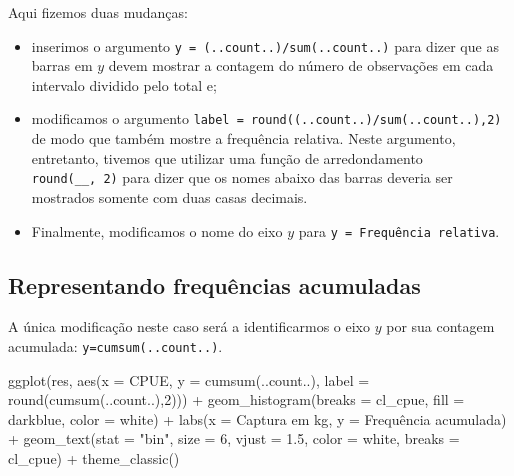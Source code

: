 \documentclass[
]{book}
\newenvironment{Shaded}{\begin{snugshade}}{\end{snugshade}}
\newcommand{\AttributeTok}[1]{\textcolor[rgb]{0.77,0.63,0.00}{#1}}
\newcommand{\DecValTok}[1]{\textcolor[rgb]{0.00,0.00,0.81}{#1}}
\newcommand{\FloatTok}[1]{\textcolor[rgb]{0.00,0.00,0.81}{#1}}
\newcommand{\FunctionTok}[1]{\textcolor[rgb]{0.00,0.00,0.00}{#1}}
\newcommand{\NormalTok}[1]{#1}
\newcommand{\SpecialCharTok}[1]{\textcolor[rgb]{0.00,0.00,0.00}{#1}}
\newcommand{\StringTok}[1]{\textcolor[rgb]{0.31,0.60,0.02}{#1}}
\begin{document}
Aqui fizemos duas mudanças:

\begin{itemize}
\item
  inserimos o argumento \texttt{y\ =\ (..count..)/sum(..count..)} para dizer que as barras em \(y\) devem mostrar a contagem do número de observações em cada intervalo dividido pelo total e;
\item
  modificamos o argumento \texttt{label\ =\ round((..count..)/sum(..count..),2)} de modo que também mostre a frequência relativa. Neste argumento, entretanto, tivemos que utilizar uma função de arredondamento \texttt{round(\_\_,\ 2)} para dizer que os nomes abaixo das barras deveria ser mostrados somente com duas casas decimais.
\item
  Finalmente, modificamos o nome do eixo \(y\) para \texttt{y\ =\ \textquotesingle{}Frequência\ relativa\textquotesingle{}}.
\end{itemize}

\hypertarget{representando-frequuxeancias-acumuladas}{%
\subsection{Representando frequências acumuladas}\label{representando-frequuxeancias-acumuladas}}

A única modificação neste caso será a identificarmos o eixo \(y\) por sua contagem acumulada: \texttt{y=cumsum(..count..)}.

\begin{Shaded}
\begin{Highlighting}[]
\FunctionTok{ggplot}\NormalTok{(res, }\FunctionTok{aes}\NormalTok{(}\AttributeTok{x =}\NormalTok{ CPUE,}
                \AttributeTok{y =} \FunctionTok{cumsum}\NormalTok{(..count..),}
                \AttributeTok{label =} \FunctionTok{round}\NormalTok{(}\FunctionTok{cumsum}\NormalTok{(..count..),}\DecValTok{2}\NormalTok{))) }\SpecialCharTok{+}
  \FunctionTok{geom\_histogram}\NormalTok{(}\AttributeTok{breaks =}\NormalTok{ cl\_cpue, }
                 \AttributeTok{fill =} \StringTok{\textquotesingle{}darkblue\textquotesingle{}}\NormalTok{, }\AttributeTok{color =} \StringTok{\textquotesingle{}white\textquotesingle{}}\NormalTok{) }\SpecialCharTok{+}
  \FunctionTok{labs}\NormalTok{(}\AttributeTok{x =} \StringTok{\textquotesingle{}Captura em kg\textquotesingle{}}\NormalTok{, }\AttributeTok{y =} \StringTok{\textquotesingle{}Frequência acumulada\textquotesingle{}}\NormalTok{) }\SpecialCharTok{+}
  \FunctionTok{geom\_text}\NormalTok{(}\AttributeTok{stat =} \StringTok{"bin"}\NormalTok{, }\AttributeTok{size =} \DecValTok{6}\NormalTok{, }\AttributeTok{vjust =} \FloatTok{1.5}\NormalTok{, }\AttributeTok{color =} \StringTok{\textquotesingle{}white\textquotesingle{}}\NormalTok{,}
            \AttributeTok{breaks =}\NormalTok{ cl\_cpue) }\SpecialCharTok{+}
  \FunctionTok{theme\_classic}\NormalTok{()}
\end{Highlighting}
\end{Shaded}
\end{document}
